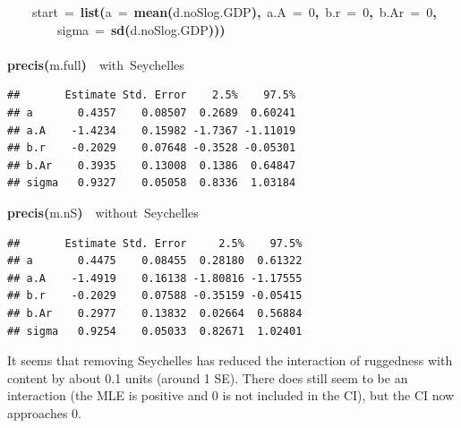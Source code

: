 \documentclass{article}
\makeatletter
\newcommand{\hlnumber}[1]{\textcolor[rgb]{0,0,0}{#1}}%
\newcommand{\hlfunctioncall}[1]{\textcolor[rgb]{.5,0,.33}{\textbf{#1}}}%
\newcommand{\hlkeyword}[1]{\textbf{#1}}%
\newcommand{\hlargument}[1]{\textcolor[rgb]{.69,.25,.02}{#1}}%
\newcommand{\hlcomment}[1]{\textcolor[rgb]{.18,.6,.34}{#1}}%
\newcommand{\hlsymbol}[1]{#1}%
\newcommand{\hlstd}[1]{\textcolor[rgb]{0,0,0}{#1}}%
\newenvironment{kframe}{%
 \def\FrameCommand##1{\hskip\@totalleftmargin \hskip-\fboxsep
 \colorbox{shadecolor}{##1}\hskip-\fboxsep
     \hskip-\linewidth \hskip-\@totalleftmargin \hskip\columnwidth}%
 \MakeFramed {\advance\hsize-\width
   \@totalleftmargin\z@ \linewidth\hsize
   \@setminipage}}%
 {\par\unskip\endMakeFramed}
\newenvironment{knitrout}{}{} %
\makeatother
\begin{document}
\begin{knitrout}
{\begin{kframe}
\begin{flushleft}
\hlstd{}{\ }{\ }{\ }{\ }\hlargument{start}{\ }\hlargument{=}{\ }\hlfunctioncall{list}\hlkeyword{(}\hlargument{a}{\ }\hlargument{=}{\ }\hlfunctioncall{mean}\hlkeyword{(}\hlsymbol{d.noS}\hlkeyword{\usebox{\hlnormalsizeboxdollar}}\hlsymbol{log.GDP}\hlkeyword{)}\hlkeyword{,}{\ }\hlargument{a.A}{\ }\hlargument{=}{\ }\hlnumber{0}\hlkeyword{,}{\ }\hlargument{b.r}{\ }\hlargument{=}{\ }\hlnumber{0}\hlkeyword{,}{\ }\hlargument{b.Ar}{\ }\hlargument{=}{\ }\hlnumber{0}\hlkeyword{,}\hspace*{\fill}\\
\hlstd{}{\ }{\ }{\ }{\ }{\ }{\ }{\ }{\ }\hlargument{sigma}{\ }\hlargument{=}{\ }\hlfunctioncall{sd}\hlkeyword{(}\hlsymbol{d.noS}\hlkeyword{\usebox{\hlnormalsizeboxdollar}}\hlsymbol{log.GDP}\hlkeyword{)}\hlkeyword{)}\hlkeyword{)}\hspace*{\fill}\\
\hlstd{}\hspace*{\fill}\\
\hlstd{}\hlfunctioncall{precis}\hlkeyword{(}\hlsymbol{m.full}\hlkeyword{)}{\ }{\ }\hlcomment{\usebox{\hlnormalsizeboxhash}{\ }with{\ }Seychelles}\mbox{}
\normalfont
\end{flushleft}
\begin{verbatim}
##       Estimate Std. Error    2.5%    97.5%
## a       0.4357    0.08507  0.2689  0.60241
## a.A    -1.4234    0.15982 -1.7367 -1.11019
## b.r    -0.2029    0.07648 -0.3528 -0.05301
## b.Ar    0.3935    0.13008  0.1386  0.64847
## sigma   0.9327    0.05058  0.8336  1.03184
\end{verbatim}
\begin{flushleft}
\ttfamily\noindent
\hlfunctioncall{precis}\hlkeyword{(}\hlsymbol{m.nS}\hlkeyword{)}{\ }{\ }\hlcomment{\usebox{\hlnormalsizeboxhash}{\ }without{\ }Seychelles}\mbox{}
\normalfont
\end{flushleft}
\begin{verbatim}
##       Estimate Std. Error     2.5%    97.5%
## a       0.4475    0.08455  0.28180  0.61322
## a.A    -1.4919    0.16138 -1.80816 -1.17555
## b.r    -0.2029    0.07588 -0.35159 -0.05415
## b.Ar    0.2977    0.13832  0.02664  0.56884
## sigma   0.9254    0.05033  0.82671  1.02401
\end{verbatim}
\end{kframe}}
\end{knitrout}


It seems that removing Seychelles has reduced the interaction of ruggedness with content by about 0.1 units (around 1 SE).
There does still seem to be an interaction (the MLE is positive and 0 is not included in the CI), but the CI now approaches 0. 
\end{document}
